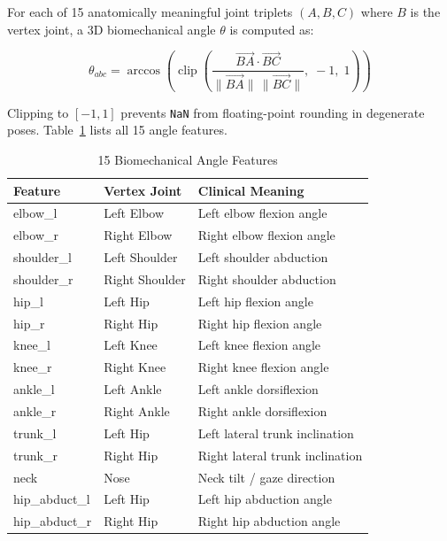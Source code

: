 \documentclass[conference]{IEEEtran}
\begin{document}
For each of 15 anatomically meaningful joint triplets $(A, B, C)$ where $B$ is the vertex
joint, a 3D biomechanical angle $\theta$ is computed as:

\begin{equation}
\theta_{abc} = \arccos\!\left(
\operatorname{clip}\!\left(\frac{\overrightarrow{BA} \cdot \overrightarrow{BC}}
{\|\overrightarrow{BA}\|\,\|\overrightarrow{BC}\|},\; -1,\; 1\right)
\right)
\label{eq:angle}
\end{equation}

\noindent Clipping to $[-1,1]$ prevents \texttt{NaN} from floating-point rounding in
degenerate poses. Table~\ref{tab:features} lists all 15 angle features.

\begin{table}[ht]
\centering
\caption{15 Biomechanical Angle Features}
\label{tab:features}
\begin{tabular}{@{}lll@{}}
\toprule
\textbf{Feature} & \textbf{Vertex Joint} & \textbf{Clinical Meaning} \\
\midrule
elbow\_l      & Left Elbow    & Left elbow flexion angle \\
elbow\_r      & Right Elbow   & Right elbow flexion angle \\
shoulder\_l   & Left Shoulder & Left shoulder abduction \\
shoulder\_r   & Right Shoulder& Right shoulder abduction \\
hip\_l        & Left Hip      & Left hip flexion angle \\
hip\_r        & Right Hip     & Right hip flexion angle \\
knee\_l       & Left Knee     & Left knee flexion angle \\
knee\_r       & Right Knee    & Right knee flexion angle \\
ankle\_l      & Left Ankle    & Left ankle dorsiflexion \\
ankle\_r      & Right Ankle   & Right ankle dorsiflexion \\
trunk\_l      & Left Hip      & Left lateral trunk inclination \\
trunk\_r      & Right Hip     & Right lateral trunk inclination \\
neck          & Nose          & Neck tilt / gaze direction \\
hip\_abduct\_l & Left Hip     & Left hip abduction angle \\
hip\_abduct\_r & Right Hip    & Right hip abduction angle \\
\bottomrule
\end{tabular}
\end{table}
\end{document}
